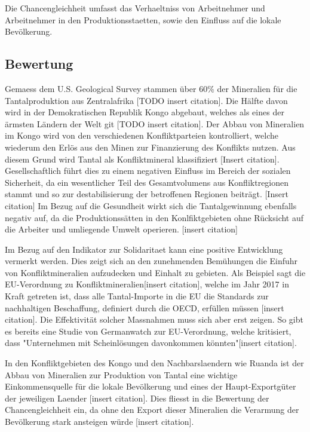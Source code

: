 Die Chancengleichheit umfasst das Verhaeltniss von Arbeitnehmer und
Arbeitnehmer in den Produktionsstaetten, sowie den Einfluss auf die lokale
Bevölkerung.

\subsection{Bewertung}

Gemaess dem U.S. Geological Survey stammen über 60\% der Mineralien für die
Tantalproduktion aus Zentralafrika [TODO insert citation]. Die H\"alfte davon 
wird in der Demokratischen Republik Kongo abgebaut, welches als eines der \"armsten
L\"andern der Welt git [TODO insert citation]. Der Abbau von Mineralien im
Kongo wird von den verschiedenen Konfliktparteien kontrolliert, welche wiederum
den Erlös aus den Minen zur Finanzierung des Konflikts nutzen. Aus diesem Grund
wird Tantal als Konfliktmineral klassifiziert [Insert citation].
Gesellschaftlich führt dies zu einem negativen Einfluss im Bereich der sozialen
Sicherheit, da ein wesentlicher Teil des Gesamtvolumens aus Konfliktregionen
stammt und so zur destabilisierung der betroffenen Regionen beitr\"agt. [Insert citation]
Im Bezug auf die Gesundheit wirkt sich die Tantalgewinnung ebenfalls negativ auf, da die 
Produktionss\"atten in den Konlfiktgebieten ohne Rücksicht auf die Arbeiter und umliegende Umwelt
operieren. [insert citation]

Im Bezug auf den Indikator zur Solidaritaet kann eine positive Entwicklung vermerkt werden.
Dies zeigt sich an den zunehmenden Bemühungen die Einfuhr von Konfliktmineralien 
aufzudecken und Einhalt zu gebieten. Als Beispiel sagt die EU-Verordnung zu Konfliktmineralien[insert citation], welche im Jahr 2017 in Kraft getreten ist, dass alle Tantal-Importe in die EU die Standards zur nachhaltigen Beschaffung, definiert durch die OECD, erfüllen müssen 
[insert citation]. Die Effektivit\"at solcher Massnahmen muss sich aber erst zeigen. 
So gibt es bereits eine Studie von Germanwatch zur EU-Verordnung, welche kritisiert, dass 
"Unternehmen mit Scheinlösungen davonkommen könnten"[insert citation].

In den Konfliktgebieten des Kongo und den Nachbarslaendern wie Ruanda ist der Abbau von 
Mineralien zur Produktion von Tantal eine wichtige Einkommensquelle für die lokale Bevölkerung
und eines der Haupt-Exportgüter der jeweiligen Laender [insert citation]. Dies fliesst in
die Bewertung der Chancengleichheit ein, da ohne den Export dieser Mineralien die Verarmung
der Bevölkerung stark ansteigen würde [insert citation].

